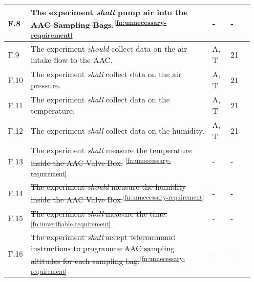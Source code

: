 \begin{longtable}[]{|m{}| m{} |m{} |m{}|m{}|}
F.8  &\st{The experiment \textit{shall} pump air into the AAC Sampling Bags.}\textsuperscript{\ref{fn:unnecessary-requirement}}                                                                                                                &     -       & -            &        \\ \hline
F.9  & The experiment \textit{should} collect data on the air intake flow to the AAC.                                                                                                      &       A, T       & 21            &        \\ \hline
F.10 & The experiment \textit{shall} collect data on the air pressure.                                                                                                                  &       A, T       & 21            &        \\ \hline
F.11 & The experiment \textit{shall} collect data on the temperature.                                                                                                                   &       A, T       & 21            &        \\ \hline
F.12 & The experiment \textit{shall} collect data on the humidity.                                                                                                                      &      A, T        & 21            &        \\ \hline
F.13 & \st{The experiment \textit{shall} measure the temperature inside the AAC Valve Box.} \textsuperscript{\ref{fn:unnecessary-requirement}}                                                                                                  &      -        & -    &        \\ \hline
F.14 & \st{The experiment \textit{should} measure the humidity inside the AAC Valve Box.}\textsuperscript{\ref{fn:unnecessary-requirement}}                                                                                                     &      -        & -            &        \\ \hline
F.15 & \st{The experiment \textit{shall} measure the time.} \textsuperscript{\ref{fn:unverifiable-requirement}}                                                                                                                                  &        -     & -            &        \\ \hline
F.16 & \st{The experiment \textit{shall} accept telecommand instructions to programme AAC sampling altitudes for each sampling bag.}\textsuperscript{\ref{fn:unnecessary-requirement}}                                                          &      -        & -           &        \\ \hline

\end{longtable}
